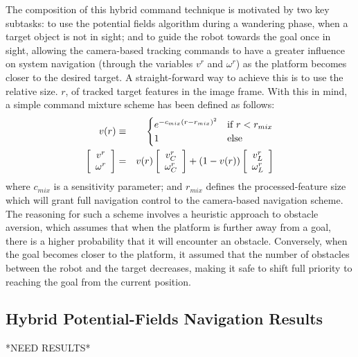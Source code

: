 	The composition of this hybrid command technique is motivated by two key subtasks: to use the potential fields algorithm during a wandering phase, when a target object is not in sight; and to guide the robot towards the goal once in sight, allowing the camera-based tracking commands to have a greater influence on system navigation (through the variables $v^{r}$ and $\omega^{r}$) as the platform becomes closer to the desired target. A straight-forward way to achieve this is to use the relative size. $r$, of tracked target features in the image frame. With this in mind, a simple command mixture scheme has been defined as follows:
	\begin{eqnarray}
		v(r) &\equiv&
		\begin{cases}
		e^{ -c_{mix} \left( r - r_{mix}\right)^{2} } 	& \text{if } r < r_{mix}	\\
		1											& \text{else}
		\end{cases}
						\nonumber \\
				\left[\begin{array}{c} v^{r} 	\\ \omega^{r} 		\end{array} \right] &=& 	
		v(r)	\left[\begin{array}{c} v^{r}_{C}\\ \omega^{r}_{C} 	\end{array} \right] + 
		(1-v(r))\left[\begin{array}{c} v^{r}_{L}\\ \omega^{r}_{L} 	\end{array} \right] 
	\end{eqnarray}
	where $c_{mix}$ is a sensitivity parameter; and $r_{mix}$ defines the processed-feature size which will grant full navigation control to the camera-based navigation scheme. The reasoning for such a scheme involves a heuristic approach to obstacle aversion, which assumes that when the platform is further away from a goal, there is a higher probability that it will encounter an obstacle. Conversely, when the goal becomes closer to the platform, it assumed that the number of obstacles between the robot and the target decreases, making it safe to shift full priority to reaching the goal from the current position.


	\subsection{Hybrid Potential-Fields Navigation Results}
	*NEED RESULTS*



